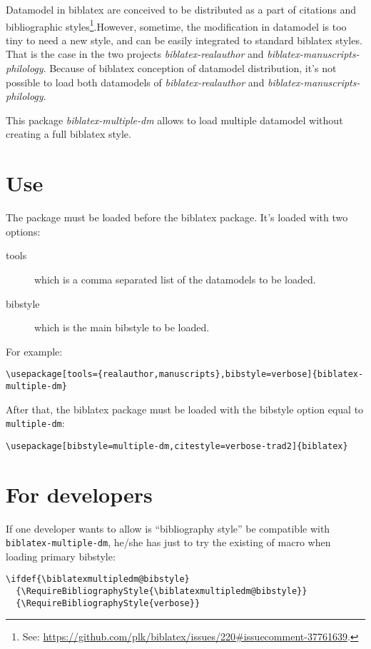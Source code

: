 \documentclass{ltxdockit}[2011/03/25]
\newcommand{\biblatex}{biblatex\xspace}
\begin{document}
\printtitlepage
\tableofcontents

Datamodel in \biblatex are conceived to be distributed as a part of citations and bibliographic styles\footnote{See: \url{https://github.com/plk/biblatex/issues/220\#issuecomment-37761639}.}.However, sometime, the modification in datamodel is too tiny to need a new style, and can be easily integrated to standard \biblatex styles. That is the case in the two projects \emph{biblatex-realauthor} and \emph{biblatex-manuscripts-philology}. Because of \biblatex conception of datamodel distribution, it's not possible to load both datamodels of \emph{biblatex-realauthor} and \emph{biblatex-manuscripts-philology}.

This package \emph{biblatex-multiple-dm} allows to load multiple datamodel without creating a full \biblatex style. 

\section{Use}
The package must be loaded before the \biblatex package. It's loaded with two options:
\begin{description}
	\item[tools] which is a comma separated list of the datamodels to be loaded.
	\item[bibstyle] which is the main bibstyle to be loaded.
\end{description}

For example:
\begin{verbatim}
\usepackage[tools={realauthor,manuscripts},bibstyle=verbose]{biblatex-multiple-dm}
\end{verbatim}

After that, the \biblatex package must be loaded with the bibstyle option equal to \verb+multiple-dm+:
\begin{verbatim}
\usepackage[bibstyle=multiple-dm,citestyle=verbose-trad2]{biblatex}
\end{verbatim}


\section{For developers} 

If one developer wants to allow is \enquote{bibliography style} be compatible with \verb+biblatex-multiple-dm+, he/she has just to try the existing of  macro  when loading primary bibstyle:

\begin{verbatim}
\ifdef{\biblatexmultipledm@bibstyle}
  {\RequireBibliographyStyle{\biblatexmultipledm@bibstyle}}
  {\RequireBibliographyStyle{verbose}}
\end{verbatim} 
\end{document}
